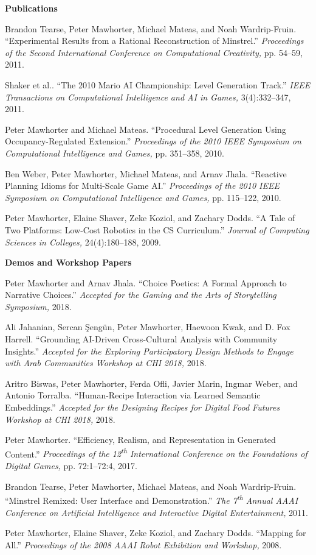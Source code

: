 \documentclass[11pt]{article}
\newenvironment{pubs}[1]{%
  \vspace{8pt}\textbf{\Large #1} \hrulefill\vspace{6pt}
  \begin{adjustwidth}{14pt}{0pt}
  \setlength{\parskip}{4pt}
  \setlength{\parindent}{-8pt}
}{%
  \end{adjustwidth}
}
\newcommand{\fullpub}[5]{%
\begin{samepage}
#1. ``#2.'' \textit{#3,} #4, #5.

\end{samepage}%
}
\newcommand{\nppub}[4]{%
\begin{samepage}
#1. ``#2.'' \textit{#3,} #4.

\end{samepage}%
}
\newcommand{\heading}[1]{\textbf{\large #1}\vspace{4pt}}
\newcommand{\tsup}[1]{\textsuperscript{#1}}
\begin{document}
\begin{pubs}{Publications}
\fullpub{Brandon Tearse, Peter Mawhorter, Michael Mateas, and Noah Wardrip-Fruin}{Experimental Results from a Rational Reconstruction of Minstrel}{Proceedings of the Second International Conference on Computational Creativity}{pp. 54--59}{2011}

\fullpub{Shaker et al.}{The 2010 Mario AI Championship: Level Generation Track}{IEEE Transactions on Computational Intelligence and AI in Games}{3(4):332--347}{2011}

\fullpub{Peter Mawhorter and Michael Mateas}{Procedural Level Generation Using Occupancy-Regulated Extension}{Proceedings of the 2010 IEEE Symposium on Computational Intelligence and Games}{pp. 351--358}{2010}

\fullpub{Ben Weber, Peter Mawhorter, Michael Mateas, and Arnav Jhala}{Reactive Planning Idioms for Multi-Scale Game AI}{Proceedings of the 2010 IEEE Symposium on Computational Intelligence and Games}{pp. 115--122}{2010}

\fullpub{Peter Mawhorter, Elaine Shaver, Zeke Koziol, and Zachary Dodds}{A Tale of Two Platforms: Low-Cost Robotics in the CS Curriculum}{Journal of Computing Sciences in Colleges}{24(4):180--188}{2009}

\vspace{6pt}
\heading{Demos and Workshop Papers}

\nppub{Peter Mawhorter and Arnav Jhala}{Choice Poetics: A Formal Approach to Narrative Choices}{Accepted for the Gaming and the Arts of Storytelling Symposium}{2018}

\nppub{Ali Jahanian, Sercan Şengün, Peter Mawhorter, Haewoon Kwak, and D. Fox Harrell}{Grounding AI-Driven Cross-Cultural Analysis with Community Insights}{Accepted for the Exploring Participatory Design Methods to Engage with Arab Communities Workshop at CHI 2018}{2018}

\nppub{Aritro Biswas, Peter Mawhorter, Ferda Ofli, Javier Marin, Ingmar Weber, and Antonio Torralba}{Human-Recipe Interaction via Learned Semantic Embeddings}{Accepted for the Designing Recipes for Digital Food Futures Workshop at CHI 2018}{2018}

\fullpub{Peter Mawhorter}{Efficiency, Realism, and Representation in Generated Content}{Proceedings of the 12\tsup{th} International Conference on the Foundations of Digital Games}{pp. 72:1--72:4}{2017}

\nppub{Brandon Tearse, Peter Mawhorter, Michael Mateas, and Noah Wardrip-Fruin}{Minstrel Remixed: User Interface and Demonstration}{The 7\tsup{th} Annual AAAI Conference on Artificial Intelligence and Interactive Digital Entertainment}{2011}

\nppub{Peter Mawhorter, Elaine Shaver, Zeke Koziol, and Zachary Dodds}{Mapping for All}{Proceedings of the 2008 AAAI Robot Exhibition and Workshop}{2008}

\end{pubs}
\end{document}
